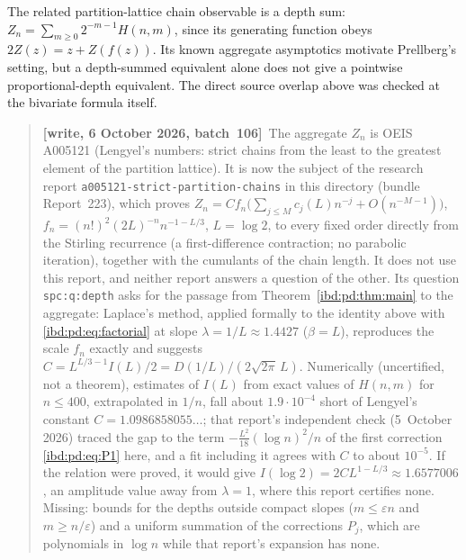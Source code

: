 \documentclass[11pt,letterpaper]{article}
\theoremstyle{remark}\newtheorem{remark}[theorem]{Remark}
\newcommand{\repopath}[1]{\nolinkurl{#1}}
\begin{document}
The related partition-lattice chain observable is a depth sum:
$Z_n=\sum_{m\geq0}2^{-m-1}H(n,m)$, since its generating function obeys $2Z(z)=z+Z(f(z))$. Its known aggregate asymptotics motivate Prellberg's setting, but a depth-summed equivalent alone does not give a pointwise proportional-depth equivalent. The direct source overlap above was checked at the bivariate formula itself.
\par\smallskip\begin{quote}\small\textbf{[write, 6 October 2026, batch~106]}\ The aggregate $Z_n$ is OEIS A005121 (Lengyel's numbers: strict chains from the least to the greatest element of the partition lattice). It is now the subject of the research report \repopath{a005121-strict-partition-chains} in this directory (bundle Report~223), which proves $Z_n=Cf_n\bigl(\sum_{j\le M}c_j(L)n^{-j}+O(n^{-M-1})\bigr)$, $f_n=(n!)^2(2L)^{-n}n^{-1-L/3}$, $L=\log2$, to every fixed order directly from the Stirling recurrence (a first-difference contraction; no parabolic iteration), together with the cumulants of the chain length. It does not use this report, and neither report answers a question of the other. Its question \texttt{spc:q:depth} asks for the passage from Theorem~\ref{ibd:pd:thm:main} to the aggregate: Laplace's method, applied formally to the identity above with \eqref{ibd:pd:eq:factorial} at slope $\lambda=1/L\approx1.4427$ ($\beta=L$), reproduces the scale $f_n$ exactly and suggests $C=L^{L/3-1}I(L)/2=D(1/L)/(2\sqrt{2\pi}\,L)$. Numerically (uncertified, not a theorem), estimates of $I(L)$ from exact values of $H(n,m)$ for $n\le400$, extrapolated in $1/n$, fall about $1.9\cdot10^{-4}$ short of Lengyel's constant $C=1.0986858055\ldots$; that report's independent check (5~October 2026) traced the gap to the term $-\frac{L^2}{18}(\log n)^2/n$ of the first correction \eqref{ibd:pd:eq:P1} here, and a fit including it agrees with $C$ to about $10^{-5}$. If the relation were proved, it would give $I(\log2)=2CL^{1-L/3}\approx1.6577006$, an amplitude value away from $\lambda=1$, where this report certifies none. Missing: bounds for the depths outside compact slopes ($m\le\varepsilon n$ and $m\ge n/\varepsilon$) and a uniform summation of the corrections $P_j$, which are polynomials in $\log n$ while that report's expansion has none.\end{quote}\smallskip
\end{document}

